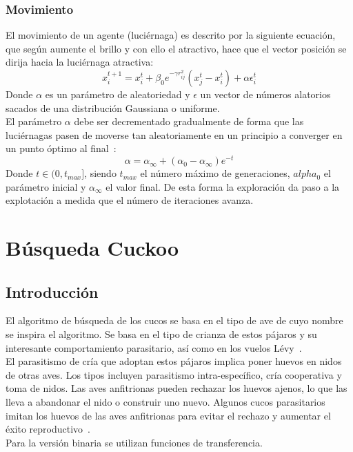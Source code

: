 \subsubsection{Movimiento}
El movimiento de un agente (luciérnaga) es descrito por la siguiente ecuación, que según aumente el brillo y con ello el atractivo, hace que el vector posición se dirija hacia la luciérnaga atractiva:
\begin{equation}
    x_i^{t+1} = x_i^t + \beta_0e^{-\gamma r_{ij}^2}(x_j^t-x_i^t)+\alpha\epsilon_i^t
\end{equation}
Donde $\alpha$ es un parámetro de aleatoriedad y $\epsilon$ un vector de números alatorios sacados de una distribución Gaussiana o uniforme. \\[6pt]
El parámetro $\alpha$ debe ser decrementado gradualmente de forma que las luciérnagas pasen de moverse tan aleatoriamente en un principio a converger en un punto óptimo al final~\cite{yang_chapter_2014}:
\begin{equation}
    \alpha = \alpha_\infty + (\alpha_0-\alpha_\infty)e^{-t}
\end{equation}
Donde $t\in(0,t_{max}]$, siendo $t_{max}$ el número máximo de generaciones, $alpha_0$ el parámetro inicial y $\alpha_\infty$ el valor final. De esta forma la exploración da paso a la explotación a medida que el número de iteraciones avanza.

\section{Búsqueda Cuckoo}
\subsection{Introducción}
El algoritmo de búsqueda de los cucos se basa en el tipo de ave de cuyo nombre se inspira el algoritmo. Se basa en el tipo de crianza de estos pájaros y su interesante comportamiento parasitario, así como en los vuelos Lévy~\cite{noauthor_levy_nodate}.\\[6pt]
El parasitismo de cría que adoptan estos pájaros implica poner huevos en nidos de otras aves. Los tipos incluyen parasitismo intra-específico, cría cooperativa y toma de nidos. Las aves anfitrionas pueden rechazar los huevos ajenos, lo que las lleva a abandonar el nido o construir uno nuevo. Algunos cucos parasitarios imitan los huevos de las aves anfitrionas para evitar el rechazo y aumentar el éxito reproductivo~\cite{yang_cuckoo_2010}.\\[6pt]
Para la versión binaria se utilizan funciones de transferencia.
